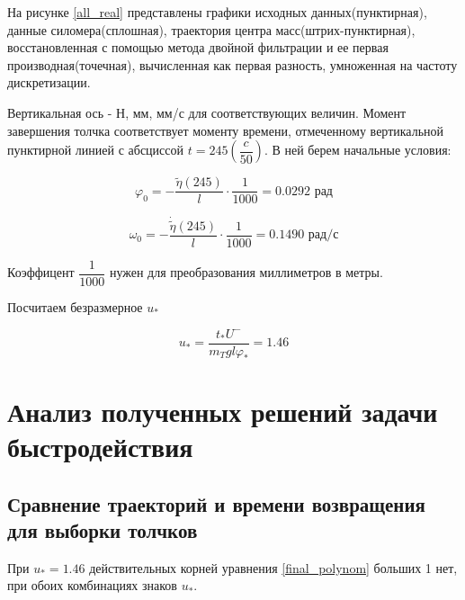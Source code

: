 \documentclass[a4paper,12pt, openany]{book}
\theoremstyle{plain} %
\theoremstyle{definition} %
\theoremstyle{remark} %
\numberwithin{equation}{chapter}
\begin{document}
{На рисунке \ref{all_real} представлены графики исходных данных(пунктирная), данные силомера(сплошная), траектория центра масс(штрих-пунктирная), восстановленная с помощью метода двойной фильтрации и ее первая производная(точечная), вычисленная как первая разность, умноженная на частоту дискретизации.

Вертикальная ось - Н, мм, мм/с для соответствующих величин. Момент завершения толчка соответствует
 моменту времени, отмеченному вертикальной пунктирной линией с абсциссой $t=245\left( \dfrac{c}{50} \right)$. В ней берем начальные условия:

$$\varphi_0=-\dfrac{\tilde{\eta}(245)}{l}\cdot\dfrac{1}{1000}=0.0292\text{ рад}$$

$$\omega_0=-\dfrac{\dot{\tilde{\eta}}(245)}{l}\cdot\dfrac{1}{1000}=0.1490\text{ рад/с}$$

Коэффицент $\dfrac{1}{1000}$ нужен для преобразования миллиметров в метры.

Посчитаем безразмерное $u_\ast$

\[
    u_\ast=\frac{t_\ast U^-}{m_Tgl\varphi_\ast }=1.46
\]


\newpage

\chapter{Анализ полученных решений задачи быстродействия}

\section{Сравнение траекторий и времени возвращения для выборки толчков}


При $u_\ast=1.46$ действительных корней уравнения \eqref{final_polynom} больших 1 нет,
при обоих комбинациях знаков $u_\ast$.

}
\end{document}
